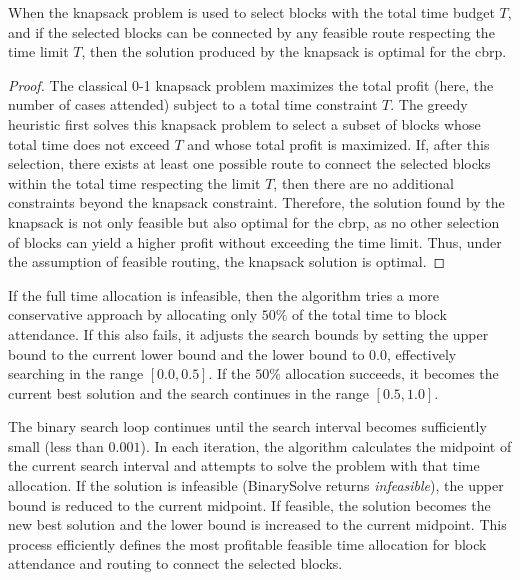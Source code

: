 \begin{property}
	When the knapsack problem is used to select blocks with the total time budget $T$, and if the selected blocks can be connected by any feasible route respecting the time limit $T$, then the solution produced by the knapsack is optimal for the \gls{cbrp}.

	\begin{proof}
		The classical 0-1 knapsack problem maximizes the total profit
		(here, the number of cases attended) subject to a total time constraint $T$. The greedy heuristic first solves this knapsack problem to select a subset of blocks whose total time does not exceed $T$ and whose total profit is maximized. If, after this selection, there exists at least one possible route to connect the selected blocks within the total time respecting the limit $T$, then there are no additional constraints beyond the knapsack constraint. Therefore, the solution found by the knapsack is not only feasible but also optimal for the \gls{cbrp}, as no other selection of blocks can yield a higher profit without exceeding the time limit. Thus, under the assumption of feasible routing, the knapsack solution is optimal.
	\end{proof}
	\label{property:knapsack-optimal-allocation}
\end{property}

If the full time allocation is infeasible, then the algorithm tries a more conservative approach by allocating only $50\%$ of the total time to block attendance. If this also fails, it adjusts the search bounds by setting the upper bound to the current lower bound and the lower bound to $0.0$, effectively searching in the range $[0.0, 0.5]$. If the $50\%$ allocation succeeds, it becomes the current best solution and the search continues in the range $[0.5, 1.0]$.

The binary search loop continues until the search interval becomes sufficiently small (less than $0.001$). In each iteration, the algorithm calculates the midpoint of the current search interval and attempts to solve the problem with that time allocation. If the solution is infeasible (BinarySolve returns \textit{infeasible}), the upper bound is reduced to the current midpoint. If feasible, the solution becomes the new best solution and the lower bound is increased to the current midpoint. This process efficiently defines the most profitable feasible time allocation for block attendance and routing to connect the selected blocks.

